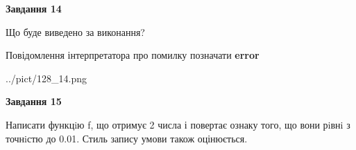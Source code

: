 \documentclass[11pt, ukrainian]{article}
\begin{document}
{\begin {large}
{\begin {center}\textbf{Завдання 14}\end {center}}\par
Що буде виведено за виконання? \par
Повідомлення інтерпретатора про помилку позначати \textbf{error}

\begin{center}
	{../pict/128_14.png}
\end{center}
\newpage

{\begin {center}\textbf{Завдання 15}\end {center}}\par

Написати функцiю f, що отримує 2 числа і повертає ознаку того, що вони рiвнi з точнiстю до 0.01. Стиль запису умови також оцінюється.\par
\newpage

\end {large}}
\end{document}
